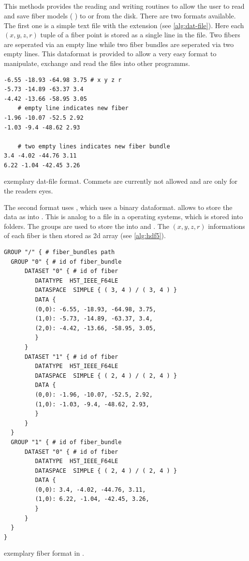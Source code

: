 \subsection{}
% 
This methods provides the reading and writing routines to allow the user to read and save fiber models (\ie{} ) to or from the disk.
There are two formats available.
The first one is a simple text file with the extension  (see \cref{alg:dat-file}).
Here each $(x,y,z,r)$ tuple of a fiber point is stored as a single line in the file.
Two fibers are seperated via an empty line while two fiber bundles are seperated via two empty lines.
This dataformat is provided to allow a very easy format to manipulate, exchange and read the files \eg{} into other programms.
% 
\begin{lstfloat}[!ht]
\begin{lstlisting}
-6.55 -18.93 -64.98 3.75 # x y z r
-5.73 -14.89 -63.37 3.4
-4.42 -13.66 -58.95 3.05
    # empty line indicates new fiber
-1.96 -10.07 -52.5 2.92
-1.03 -9.4 -48.62 2.93

    # two empty lines indicates new fiber bundle
3.4 -4.02 -44.76 3.11
6.22 -1.04 -42.45 3.26
\end{lstlisting}
\caption{exemplary dat-file format. Commets are currently not allowed and are only for the readers eyes.}\label{alg:dat-file}
\end{lstfloat}
% 
% 
\par
The second format uses \hdf{} \cite{hdf5}, which uses a binary dataformat.
\hdf{} allows to store the data as  into .
This is analog to a file in a operating systems, which is stored into folders.
The \hdf{} groups are used to store the  into  and .
The $(x,y,z,r)$ informations of each fiber is then stored as 2d array (see \cref{alg:hdf5}). 
% 
\begin{lstfloat}[!ht]
\begin{lstlisting}
GROUP "/" { # fiber_bundles path
  GROUP "0" { # id of fiber_bundle
      DATASET "0" { # id of fiber
         DATATYPE  H5T_IEEE_F64LE
         DATASPACE  SIMPLE { ( 3, 4 ) / ( 3, 4 ) }
         DATA {
         (0,0): -6.55, -18.93, -64.98, 3.75,
         (1,0): -5.73, -14.89, -63.37, 3.4,
         (2,0): -4.42, -13.66, -58.95, 3.05,
         }
      }
      DATASET "1" { # id of fiber
         DATATYPE  H5T_IEEE_F64LE
         DATASPACE  SIMPLE { ( 2, 4 ) / ( 2, 4 ) }
         DATA {
         (0,0): -1.96, -10.07, -52.5, 2.92,
         (1,0): -1.03, -9.4, -48.62, 2.93,
         }
      }
  }
  GROUP "1" { # id of fiber_bundle
      DATASET "0" { # id of fiber
         DATATYPE  H5T_IEEE_F64LE
         DATASPACE  SIMPLE { ( 2, 4 ) / ( 2, 4 ) }
         DATA {
         (0,0): 3.4, -4.02, -44.76, 3.11,
         (1,0): 6.22, -1.04, -42.45, 3.26,
         }
      }
  }
}
\end{lstlisting}
\caption{exemplary fiber format in \hdf{}.} \label{alg:hdf5}
\end{lstfloat}
% 
% 
% 
